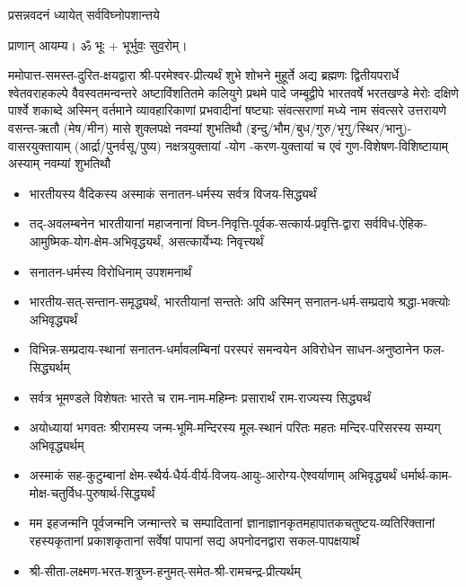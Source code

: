 




{प्रसन्नवदनं ध्यायेत् सर्वविघ्नोपशान्तये}

प्राणान् आयम्य। ॐ भूः + भूर्भुवः॒ सुव॒रोम्।


ममोपात्त-समस्त-दुरित-क्षयद्वारा श्री-परमेश्वर-प्रीत्यर्थं शुभे शोभने मुहूर्ते अद्य ब्रह्मणः
द्वितीयपरार्धे श्वेतवराहकल्पे वैवस्वतमन्वन्तरे अष्टाविंशतितमे कलियुगे प्रथमे पादे
जम्बूद्वीपे भारतवर्षे भरतखण्डे मेरोः दक्षिणे पार्श्वे शकाब्दे अस्मिन् वर्तमाने व्यावहारिकाणां प्रभवादीनां षष्ट्याः संवत्सराणां मध्ये \blank{} नाम संवत्सरे उत्तरायणे वसन्त-ऋतौ (मेष/मीन) मासे
शुक्लपक्षे नवम्यां शुभतिथौ (इन्दु/भौम/बुध/गुरु/भृगु/स्थिर/भानु)-वासरयुक्तायाम्
(आर्द्रा/पुनर्वसू/पुष्य) नक्षत्रयुक्तायां \blank{}-योग \blank{}-करण-युक्तायां च एवं गुण-विशेषण-विशिष्टायाम्
अस्याम् नवम्यां शुभतिथौ

\begin{itemize}

    \item भारतीयस्य वैदिकस्य अस्माकं सनातन-धर्मस्य सर्वत्र विजय-सिद्ध्यर्थं

    \item तद्-अवलम्बनेन भारतीयानां महाजनानां विघ्न-निवृत्ति-पूर्वक-सत्कार्य-प्रवृत्ति-द्वारा सर्वविध-ऐहिक-आमुष्मिक-योग-क्षेम-अभिवृद्ध्यर्थं, असत्कार्येभ्यः निवृत्त्यर्थं

    \item सनातन-धर्मस्य विरोधिनाम् उपशमनार्थं

    \item भारतीय-सत्-सन्तान-समृद्ध्यर्थं, भारतीयानां सन्ततेः अपि अस्मिन् सनातन-धर्म-सम्प्रदाये श्रद्धा-भक्त्योः अभिवृद्ध्यर्थं

    \item विभिन्न-सम्प्रदाय-स्थानां सनातन-धर्मावलम्बिनां परस्परं समन्वयेन अविरोधेन साधन-अनुष्ठानेन फल-सिद्ध्यर्थम्

    \item सर्वत्र भूमण्डले विशेषतः भारते च राम-नाम-महिम्नः प्रसारार्थं राम-राज्यस्य सिद्ध्यर्थं

    \item अयोध्यायां भगवतः श्रीरामस्य जन्म-भूमि-मन्दिरस्य मूल-स्थानं परितः महतः मन्दिर-परिसरस्य सम्यग् अभिवृद्ध्यर्थम्

    \item अस्माकं सह-कुटुम्बानां क्षेम-स्थैर्य-धैर्य-वीर्य-विजय-आयुः-आरोग्य-ऐश्वर्याणाम् अभिवृद्ध्यर्थं धर्मार्थ-काम-मोक्ष-चतुर्विध-पुरुषार्थ-सिद्ध्यर्थं

    \item मम इहजन्मनि पूर्वजन्मनि जन्मान्तरे च सम्पादितानां ज्ञानाज्ञानकृतमहा\-पातकचतुष्टय-व्यतिरिक्तानां रहस्यकृतानां प्रकाशकृतानां सर्वेषां पापानां सद्य अपनोदनद्वारा सकल-पापक्षयार्थं

    \item श्री-सीता-लक्ष्मण-भरत-शत्रुघ्न-हनुमत्-समेत-श्री-रामचन्द्र-प्रीत्यर्थम्

    \end{itemize}

